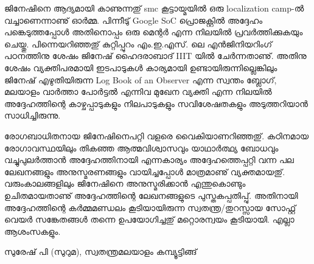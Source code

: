 \newpage
{}

ജിനേഷിനെ ആദ്യമായി കാണുന്നതു് smc കൂട്ടായ്മയില്‍ ഒരു localization camp-ല്‍ വച്ചാണെന്നാണു് ഓര്‍മ്മ. പിന്നീടു് Google SoC പ്രൊജക്റ്റില്‍ അദ്ദേഹം പങ്കെടുത്തപ്പോള്‍ അതിനൊപ്പം ഒരു മെന്റര്‍ എന്ന നിലയില്‍ പ്രവര്‍ത്തിക്കുകയും ചെയ്തു. പിന്നെയറിഞ്ഞതു് കുറ്റിപ്പുറം എം.ഇ.എസ്. ലെ എന്‍ജിനിയറിംഗ്  പഠനത്തിനു ശേഷം ജിനേഷ് ഹൈദരാബാദ് IIIT യില്‍ ചേര്‍ന്നതാണു്. അതിനു ശേഷം വ്യക്തിപരമായി ഇടപാടുകള്‍ കാര്യമായി ഉണ്ടായിരുന്നില്ലെങ്കിലും ജിനേഷ് എഴുതിയിരുന്ന Log Book of an Observer എന്ന സ്വന്തം ബ്ലോഗ്, മലയാളം വാര്‍ത്താ പോര്‍ട്ടല്‍ എന്നിവ മുഖേന വ്യക്തി എന്ന നിലയില്‍ അദ്ദേഹത്തിന്റെ കാഴ്ചപ്പാടുകളും നിലപാടുകളും സവിശേഷതകളും അടുത്തറിയാന്‍ സാധിച്ചിരുന്നു.

രോഗബാധിതനായ ജിനേഷിനെപറ്റി വളരെ വൈകിയാണറിഞ്ഞതു്. കഠിനമായ രോഗാവസ്ഥയിലും തികഞ്ഞ ആത്മവിശ്വാസവും യാഥാര്‍ത്ഥ്യ ബോധവും വച്ചുപുലര്‍ത്താന്‍ അദ്ദേഹത്തിനായി എന്നകാര്യം  അദ്ദേഹത്തെപ്പറ്റി വന്ന പല ലേഖനങ്ങളും അനുസ്മരണങ്ങളും വായിച്ചപ്പോള്‍ മാത്രമാണു്  വ്യക്തമായതു്. വരുംകാലങ്ങളിലും ജിനേഷിനെ അനുസ്മരിക്കാന്‍ എന്തുകൊണ്ടും ഉചിതമായതാണു് അദ്ദേഹത്തിന്റെ ലേഖനങ്ങളുടെ പുസ്തകപ്പതിപ്പു്. അതിനായി അദ്ദേഹത്തിന്റെ കര്‍മ്മമണ്ഡലം കൂടിയായിരുന്ന സ്വതന്ത്ര/തുറസ്സായ സോഫ്റ്റ് വെയര്‍ സങ്കേതങ്ങള്‍ തന്നെ ഉപയോഗിച്ചതു് മറ്റൊരന്വയം കൂടിയായി. എല്ലാ ആശംസകളും.

\begin{flushright}സുരേഷ് പി (സുറുമ), സ്വതന്ത്രമലയാളം  കമ്പ്യൂട്ടിങ്ങ്\end{flushright}
\newpage
